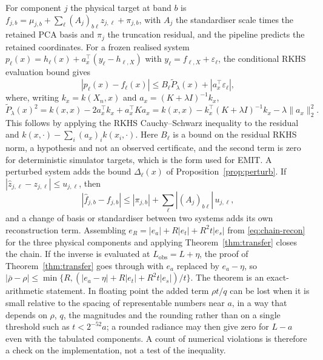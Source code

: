 For component $j$ the physical target at band $b$ is $f_{j,b}=\mu_{j,b}+\sum_\ell(A_j)_{b\ell}z_{j,\ell}+\pi_{j,b}$,
with $A_j$ the standardiser scale times the retained PCA basis and $\pi_j$ the truncation residual, and the
pipeline predicts the retained coordinates. For a frozen realised system
$p_\ell(x)=h_\ell(x)+a_x^{\top}(y_\ell-h_{\ell,X})$ with $y_\ell=f_{\ell,X}+\varepsilon_\ell$, the conditional
RKHS evaluation bound \cite{rw,nmkc} gives
\begin{equation}\label{eq:chain-coord}
|p_\ell(x)-f_\ell(x)|\le B_\ell\widetilde P_\lambda(x)+|a_x^{\top}\varepsilon_\ell|,
\end{equation}
where, writing $k_x=k(X_n,x)$ and $a_x=(K+\lambda I)^{-1}k_x$,
\[
\widetilde P_\lambda(x)^2
 =k(x,x)-2a_x^\top k_x+a_x^\top K a_x
 =k(x,x)-k_x^\top(K+\lambda I)^{-1}k_x-\lambda\|a_x\|_2^2.
\]
This follows by applying the RKHS Cauchy--Schwarz inequality to the residual and
$k(x,\cdot)-\sum_i(a_x)_i k(x_i,\cdot)$.
Here $B_\ell$ is a bound on the residual RKHS norm, a hypothesis and not an observed certificate, and the second term is zero for
deterministic simulator targets, which is the form used for EMIT. A perturbed system adds the bound
$\Delta_\ell(x)$ of Proposition~\ref{prop:perturb}. If $|\widehat z_{j,\ell}-z_{j,\ell}|\le u_{j,\ell}$, then
\begin{equation}\label{eq:chain-recon}
|\widehat f_{j,b}-f_{j,b}|\le|\pi_{j,b}|+\sum_\ell|(A_j)_{b\ell}|\,u_{j,\ell},
\end{equation}
and a change of basis or standardiser between two systems adds its own reconstruction term. Assembling
$e_R=|e_a|+R|e_t|+R^2t|e_s|$ from \eqref{eq:chain-recon} for the three physical components and applying
Theorem~\ref{thm:transfer} closes the chain. If the inverse is evaluated at $L_{\mathrm{obs}}=L+\eta$, the proof of
Theorem~\ref{thm:transfer} goes through with $e_a$ replaced by $e_a-\eta$, so
$|\bar\rho-\rho|\le\min\{R,(|e_a-\eta|+R|e_t|+R^2t|e_s|)/t\}$. The theorem is an
exact-arithmetic statement. In floating point the added term $\rho t/q$ can be lost when it is
small relative to the spacing of representable numbers near $a$, in a way that depends on
$\rho$, $q$, the magnitudes and the rounding rather than on a single threshold such as
$t<2^{-52}a$; a rounded radiance may then give zero for $L-a$ even with the tabulated
components. A count of numerical violations is therefore a check on the implementation, not a
test of the inequality.

